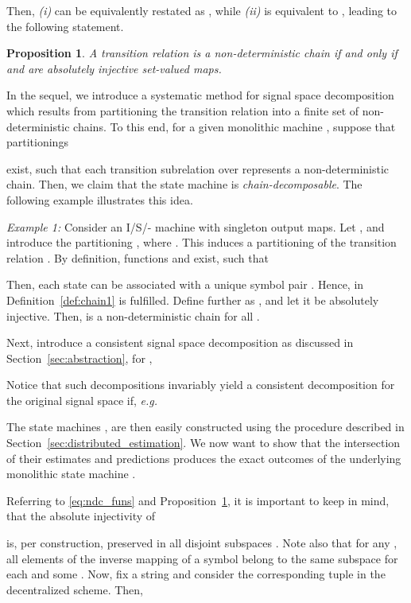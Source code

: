 \documentclass[a4paper, 10pt, conference]{ieeeconf}
\newtheorem{proposition}{Proposition}
\newcommand{\eg}{\emph{e.g.}~}
\begin{document}
Then, \emph{(i)} can be equivalently restated as ,  while \emph{(ii)} is equivalent to , leading to the following statement.
\begin{proposition}\label{def:chain2}
A transition relation  is a non-deterministic chain if and only if  and  are absolutely injective set-valued maps.
\end{proposition}




In the sequel, we introduce a systematic method for signal space decomposition which results from partitioning the transition relation  into a finite set of non-deterministic chains. To this end, for a given monolithic machine , suppose that partitionings

exist, such that each transition subrelation  over  represents a non-deterministic chain. Then, we claim that the state machine  is \emph{chain-decomposable}. The following example illustrates this idea.

\emph{Example 1:}
Consider an I/S/- machine  with singleton output maps. Let , and introduce the partitioning , where . This induces a partitioning of the transition relation . By definition, functions  and  exist, such that

Then, each state  can be associated with a unique symbol pair . Hence,  in Definition~\ref{def:chain1} is fulfilled. Define further  as , and let it be absolutely injective. Then,  is a non-deterministic chain for all .~\QED


Next, introduce a consistent signal space decomposition as discussed in Section~\ref{sec:abstraction}, for , 

Notice that such decompositions invariably yield a consistent decomposition  for the original signal space  if, \eg

The state machines ,  are then easily constructed using the procedure described in Section~\ref{sec:distributed_estimation}. We now want to show that the intersection of their estimates and predictions produces the exact outcomes of the underlying monolithic state machine .



Referring to \eqref{eq:ndc_funs} and Proposition~\ref{def:chain2}, it is important to keep in mind, that the absolute injectivity of

is, per construction, preserved in all disjoint subspaces . Note also that for any , all elements of the inverse mapping of a symbol  belong to the same subspace  for each  and some . Now, fix a string  and consider the corresponding tuple  in the decentralized scheme. Then,
\end{document}
